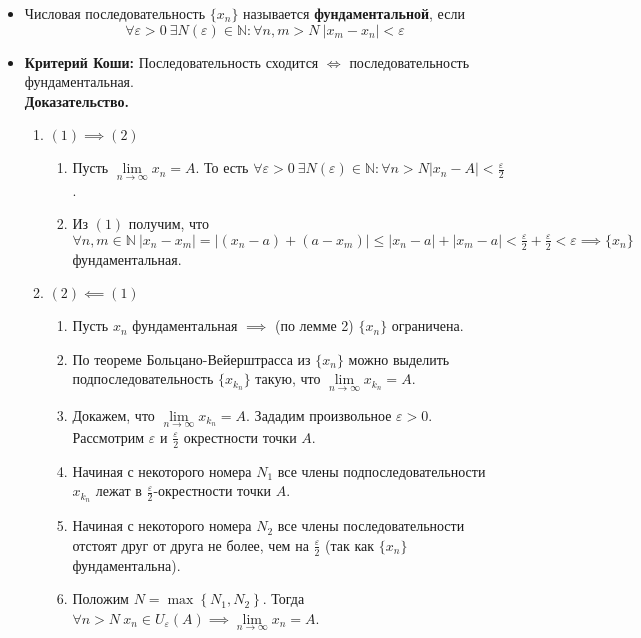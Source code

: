 \documentclass{article}
\begin{document}
\begin{itemize}
\begin{enumerate}
    \end{enumerate}  
    \item Числовая последовательность \(\{x_n\}\) называется \textbf{фундаментальной}, если
    \[
        \forall \varepsilon > 0\ \exists N(\varepsilon) \in \mathbb{N}: \forall n, m > N\ \left\vert x_{m} - x_{n} \right\vert < \varepsilon
    \]
    \item \textbf{Критерий Коши:} Последовательность сходится \(\iff\) последовательность фундаментальная.\\
    \textbf{Доказательство.}
    \begin{enumerate}
    \item \((1) \implies (2)\)
    \begin{enumerate}
        \item Пусть \(\lim\limits_{n \to \infty} x_n = A\). То есть \(\displaystyle \forall \varepsilon > 0\
        \exists N(\varepsilon) \in \mathbb{N}: \forall n > N \left\vert x_n - A \right\vert < \frac{\varepsilon}{2}\).
        \item Из \({(1)}\) получим, что \(\displaystyle \forall n, m \in \mathbb{N}\ \left\vert x_n  - x_m \right\vert = \left\vert (x_n - a) + (a - x_m) \right\vert \leq \left\vert x_n - a \right\vert + \left\vert x_m  - a \right\vert < \frac{\varepsilon}{2} + \frac{\varepsilon}{2} < \varepsilon \implies \{x_n\}\) фундаментальная.  
    \end{enumerate}
    \item \((2) \impliedby (1)\)
    \begin{enumerate}
        \item Пусть \(x_n\) фундаментальная \(\implies\) (по лемме 2) \(\{x_n\}\) ограничена.
        \item По теореме Больцано-Вейерштрасса из \(\{x_n\}\) можно выделить подпоследовательность \(\{x_{k_n}\}\) такую, что \( \lim\limits_{n \to \infty} x_{k_n} = A\).
        \item Докажем, что \( \lim\limits_{n \to \infty} x_{k_n} = A\). Зададим произвольное \(\varepsilon > 0\). Рассмотрим \(\varepsilon\) и \(\displaystyle \frac{\varepsilon}{2}\) окрестности точки \(A\).
        \item Начиная с некоторого номера \(N_1\) все члены подпоследовательности \(x_{k_n}\) лежат в \(\displaystyle \frac{\varepsilon}{2}\)-окрестности точки \(A\).
        \item Начиная с некоторого номера \(N_2\) все члены последовательности отстоят друг от друга не более, чем на \(\displaystyle \frac{\varepsilon}{2}\) (так как \(\{x_n\}\) фундаментальна).
        \item Положим \(N = \max\left\{N_1, N_2\right\}\). Тогда \(\forall n > N\ x_n \in U_{\varepsilon}(A) \implies \lim\limits_{n \to \infty} x_n = A\).  
    \end{enumerate}
    \end{enumerate}
\end{itemize}
\end{document}

